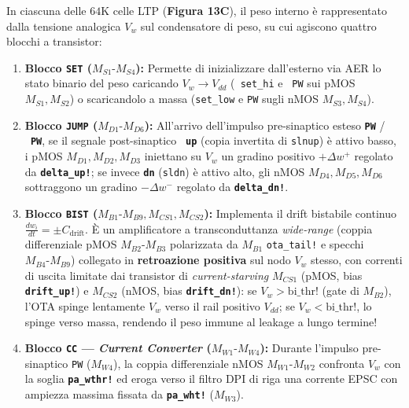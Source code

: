 \documentclass[11pt,a4paper]{article}
\begin{document}
In ciascuna delle $64\text{K}$ celle LTP (\textbf{Figura 13C}), il peso interno è rappresentato dalla tensione analogica \textbf{$V_w$} sul condensatore di peso, su cui agiscono quattro blocchi a transistor:
\begin{enumerate}
  \item \textbf{Blocco \texttt{SET} ($M_{S1}\text{-}M_{S4}$):} Permette di inizializzare dall'esterno via AER lo stato binario del peso caricando $V_w \to V_{dd}$ (\texttt{~set\_hi} e \texttt{~PW} sui pMOS $M_{S1}, M_{S2}$) o scaricandolo a massa (\texttt{set\_low} e \texttt{PW} sugli nMOS $M_{S3}, M_{S4}$).
  \item \textbf{Blocco \texttt{JUMP} ($M_{D1}\text{-}M_{D6}$):} All'arrivo dell'impulso pre-sinaptico esteso \textbf{\texttt{PW}} / \textbf{\texttt{~PW}}, se il segnale post-sinaptico \textbf{\texttt{~up}} (copia invertita di \texttt{slnup}) è attivo basso, i pMOS \textbf{$M_{D1}, M_{D2}, M_{D3}$} iniettano su $V_w$ un gradino positivo $+\Delta w^+$ regolato da \textbf{\texttt{delta\_up!}}; se invece \textbf{\texttt{dn}} (\texttt{sldn}) è attivo alto, gli nMOS \textbf{$M_{D4}, M_{D5}, M_{D6}$} sottraggono un gradino $-\Delta w^-$ regolato da \textbf{\texttt{delta\_dn!}}.
  \item \textbf{Blocco \texttt{BIST} ($M_{B1}\text{-}M_{B9}, M_{CS1}, M_{CS2}$):} Implementa il drift bistabile continuo $\frac{dw_i}{dt} = \pm C_{\text{drift}}$. È un amplificatore a transconduttanza \textit{wide-range} (coppia differenziale pMOS \textbf{$M_{B2}\text{-}M_{B3}$} polarizzata da \textbf{$M_{B1}$} \texttt{ota\_tail!} e specchi \textbf{$M_{B4}\text{-}M_{B9}$}) collegato in \textbf{retroazione positiva} sul nodo $V_w$ stesso, con correnti di uscita limitate dai transistor di \textit{current-starving} \textbf{$M_{CS1}$} (pMOS, bias \textbf{\texttt{drift\_up!}}) e \textbf{$M_{CS2}$} (nMOS, bias \textbf{\texttt{drift\_dn!}}): se $V_w > \text{bi\_thr!}$ (gate di $M_{B2}$), l'OTA spinge lentamente $V_w$ verso il rail positivo $V_{dd}$; se $V_w < \text{bi\_thr!}$, lo spinge verso massa, rendendo il peso immune al leakage a lungo termine!
  \item \textbf{Blocco \texttt{CC} --- \textit{Current Converter} ($M_{W1}\text{-}M_{W4}$):} Durante l'impulso pre-sinaptico \texttt{PW} ($M_{W4}$), la coppia differenziale nMOS \textbf{$M_{W1}\text{-}M_{W2}$} confronta $V_w$ con la soglia \textbf{\texttt{pa\_wthr!}} ed eroga verso il filtro DPI di riga una corrente EPSC con ampiezza massima fissata da \textbf{\texttt{pa\_wht!}} ($M_{W3}$).
\end{enumerate}
\end{document}
